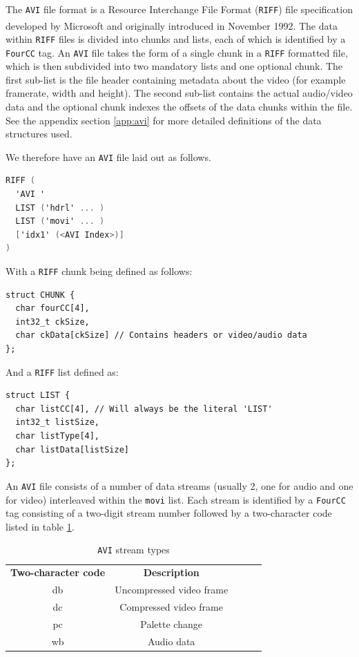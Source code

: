 \documentclass[paper=a4, fontsize=11pt,twoside]{scrartcl}
\numberwithin{table}{section}
\numberwithin{figure}{section}
\numberwithin{algorithm}{section}
\begin{document}
The \texttt{AVI} file format is a Resource Interchange File Format (\texttt{RIFF}) file specification developed by Microsoft and originally introduced in November 1992\textsuperscript{\cite{aviformat}}. The data within \texttt{RIFF} files is divided into chunks and lists, each of which is identified by a \texttt{FourCC} tag. An \texttt{AVI} file takes the form of a single chunk in a \texttt{RIFF} formatted file, which is then subdivided into two mandatory lists and one optional chunk. The first sub-list is the file header containing metadata about the video (for example framerate, width and height). The second sub-list contains the actual audio/video data and the optional chunk indexes the offsets of the data chunks within the file. See the appendix section \ref{app:avi} for more detailed definitions of the data structures used.

We therefore have an \texttt{AVI} file laid out as follows.
\begin{lstlisting}[language=C, caption={\texttt{AVI RIFF} form}, frame=single, upquote=true, showstringspaces=false]
RIFF (
  'AVI '
  LIST ('hdrl' ... )
  LIST ('movi' ... )
  ['idx1' (<AVI Index>)]
)
\end{lstlisting}

\noindent
With a \texttt{RIFF} chunk being defined as follows:

\begin{lstlisting}[caption={\texttt{RIFF} chunk}, frame=single]
struct CHUNK {
  char fourCC[4],
  int32_t ckSize,
  char ckData[ckSize] // Contains headers or video/audio data
};
\end{lstlisting}

\noindent
And a \texttt{RIFF} list defined as:

\begin{lstlisting}[caption={\texttt{RIFF} list}, frame=single]
struct LIST {
  char listCC[4], // Will always be the literal 'LIST'
  int32_t listSize,
  char listType[4],
  char listData[listSize]
};
\end{lstlisting}

\noindent
An \texttt{AVI} file consists of a number of data streams (usually 2, one for audio and one for video) interleaved within the \texttt{movi} list. Each stream is identified by a \texttt{FourCC} tag consisting of a two-digit stream number followed by a two-character code listed in table \ref{table:fourcc}.

\begin{table}[h]
\centering
\begin{tabular}{|c|c|lll}
\cline{1-2}
\textbf{Two-character code} & \textbf{Description}       \\ \cline{1-2}
db                          & Uncompressed video frame   \\ \cline{1-2}
dc                          & Compressed video frame     \\ \cline{1-2}
pc                          & Palette change             \\ \cline{1-2}
wb                          & Audio data                 \\ \cline{1-2}
\end{tabular}
\caption{\texttt{AVI} stream types}
\label{table:fourcc}
\end{table}
\end{document}
